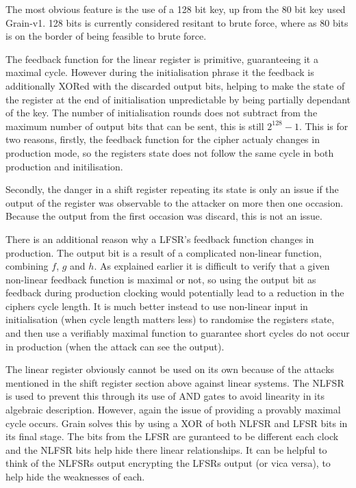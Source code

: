 \documentclass{report}
\begin{document}
The most obvious feature is the use of a 128 bit key, up from the 80 bit key used Grain-v1. 128 bits is currently considered resitant to brute force, where as 80 bits is on the border of being feasible to brute force\cite{80keysize}.

The feedback function for the linear register is primitive, guaranteeing it a maximal cycle\cite{?}. However during the initialisation phrase it the feedback is additionally XORed with the discarded output bits, helping to make the state of the register at the end of initialisation unpredictable by being partially dependant of the key. The number of initialisation rounds does not subtract from the maximum number of output bits that can be sent, this is still $2^128-1$. This is for two reasons, firstly, the feedback function for the cipher actualy changes in production mode, so the registers state does not follow the same cycle in both production and initilisation.

Secondly, the danger in a shift register repeating its state is only an issue if the output of the register was observable to the attacker on more then one occasion. Because the output from the first occasion was discard, this is not an issue.

There is an additional reason why a LFSR's feedback function changes in production. The output bit is a result of a complicated non-linear function, combining $f$, $g$ and $h$. As explained earlier it is difficult to verify that a given non-linear feedback function is maximal or not, so using the output bit as feedback during production clocking would potentially lead to a reduction in the ciphers cycle length. It is much better instead to use non-linear input in initialisation (when cycle length matters less) to randomise the registers state, and then use a verifiably maximal function to guarantee short cycles do not occur in production (when the attack can see the output).

The linear register obviously cannot be used on its own because of the attacks mentioned in the shift register section above against linear systems. The NLFSR is used to prevent this through its use of AND gates to avoid linearity in its algebraic description. However, again the issue of providing a provably maximal cycle occurs. Grain solves this by using a XOR of both NLFSR and LFSR bits in its final stage. The bits from the LFSR are guranteed to be different each clock and the NLFSR bits help hide there linear relationships. It can be helpful to think of the NLFSRs output encrypting the LFSRs output (or vica versa), to help hide the weaknesses of each.
\end{document}
